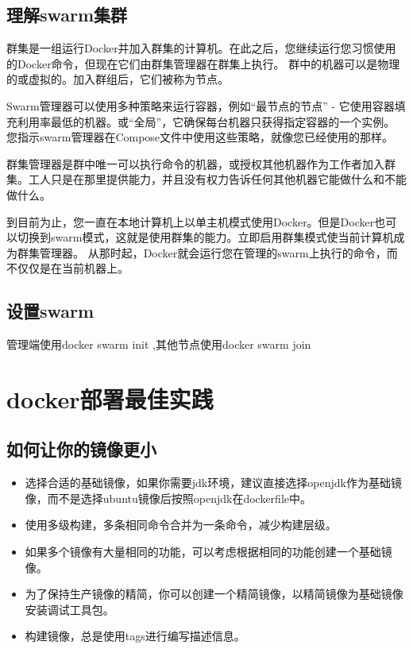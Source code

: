 \documentclass[letterpaper,10pt,english]{sphinxmanual}
\begin{document}
\section{理解swarm集群}
\label{\detokenize{_u5feb_u901f_u5165_u95e8/04-swarms:swarm}}
群集是一组运行Docker并加入群集的计算机。在此之后，您继续运行您习惯使用的Docker命令，但现在它们由群集管理器在群集上执行。
群中的机器可以是物理的或虚拟的。加入群组后，它们被称为节点。

Swarm管理器可以使用多种策略来运行容器，例如“最节点的节点” - 它使用容器填充利用率最低的机器。或“全局”，它确保每台机器只获得指定容器的一个实例。
您指示swarm管理器在Compose文件中使用这些策略，就像您已经使用的那样。

群集管理器是群中唯一可以执行命令的机器，或授权其他机器作为工作者加入群集。工人只是在那里提供能力，并且没有权力告诉任何其他机器它能做什么和不能做什么。

到目前为止，您一直在本地计算机上以单主机模式使用Docker。但是Docker也可以切换到swarm模式，这就是使用群集的能力。立即启用群集模式使当前计算机成为群集管理器。
从那时起，Docker就会运行您在管理的swarm上执行的命令，而不仅仅是在当前机器上。


\section{设置swarm}
\label{\detokenize{_u5feb_u901f_u5165_u95e8/04-swarms:id1}}
管理端使用docker swarm init ,其他节点使用docker swarm join


\chapter{docker部署最佳实践}
\label{\detokenize{_u8fd0_u884c_u5e94_u7528/01-_u90e8_u7f72_u5e94_u7528::doc}}\label{\detokenize{_u8fd0_u884c_u5e94_u7528/01-_u90e8_u7f72_u5e94_u7528:docker}}

\section{如何让你的镜像更小}
\label{\detokenize{_u8fd0_u884c_u5e94_u7528/01-_u90e8_u7f72_u5e94_u7528:id1}}\begin{itemize}
\item {} 
选择合适的基础镜像，如果你需要jdk环境，建议直接选择openjdk作为基础镜像，而不是选择ubuntu镜像后按照openjdk在dockerfile中。

\item {} 
使用多级构建，多条相同命令合并为一条命令，减少构建层级。

\item {} 
如果多个镜像有大量相同的功能，可以考虑根据相同的功能创建一个基础镜像。

\item {} 
为了保持生产镜像的精简，你可以创建一个精简镜像，以精简镜像为基础镜像安装调试工具包。

\item {} 
构建镜像，总是使用tags进行编写描述信息。

\end{itemize}
\end{document}
